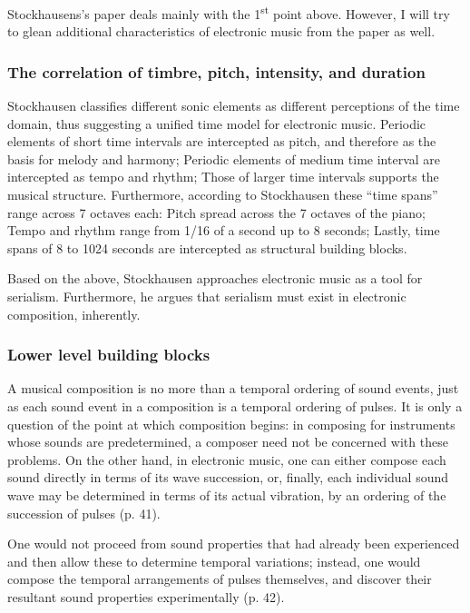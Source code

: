 \documentclass[a4paper,11pt]{article}
\newenvironment{MyShadequote}[1][]
    {\begin{mdframed}[style=MyShadeQuoteStyle,#1]}
    {\end{mdframed}}
\begin{document}
Stockhausens's paper deals mainly with the 1\textsuperscript{st} point above.
However, I will try to glean additional characteristics of electronic music from the paper as well.

\subsubsection{The correlation of timbre, pitch, intensity, and duration}
\label{subs:stockhausen:time}

Stockhausen classifies different sonic elements as different perceptions of the time domain, thus suggesting a unified time model for electronic music.
Periodic elements of short time intervals are intercepted as pitch, and therefore as the basis for melody and harmony;
Periodic elements of medium time interval are intercepted as tempo and rhythm;
Those of larger time intervals supports the musical structure.
Furthermore, according to Stockhausen these ``time spans'' range across 7 octaves each:
Pitch spread across the 7 octaves of the piano;
Tempo and rhythm range from 1/16 of a second up to 8 seconds;
Lastly, time spans of 8 to 1024 seconds are intercepted as structural building blocks.

Based on the above, Stockhausen approaches electronic music as a tool for serialism.
Furthermore, he argues that serialism must exist in electronic composition, inherently.

\subsubsection{Lower level building blocks}
\label{subs:stockhausen:sound}

\begin{MyShadequote}
  A musical composition is no more than a temporal ordering of sound events, just as each sound event in a composition is a temporal ordering of pulses.
  It is only a question of the point at which composition begins:
  in composing for instruments whose sounds are predetermined, a composer need not be concerned with these problems.
  On the other hand, in electronic music, one can either compose each sound directly in terms of its wave succession, or, finally, each individual sound wave may be determined in terms of its actual vibration, by an ordering of the succession of pulses (p. 41).
\end{MyShadequote}

\begin{MyShadequote}
  One would not proceed from sound properties that had already been experienced and then allow these to determine temporal variations;
  instead, one would compose the temporal arrangements of pulses themselves, and discover their resultant sound properties experimentally (p. 42).
\end{MyShadequote}
\end{document}
